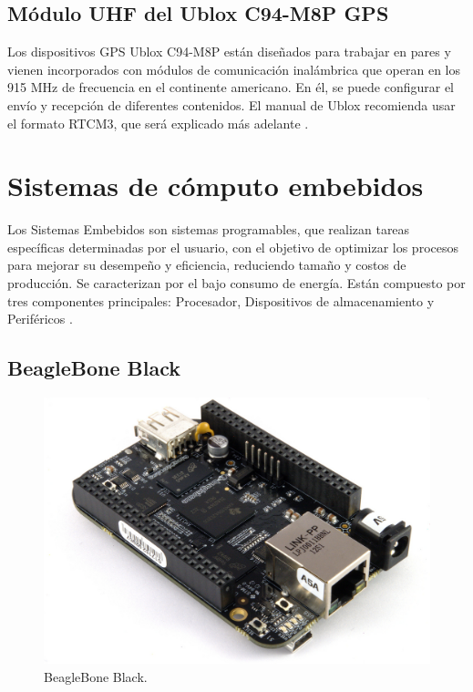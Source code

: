 \subsection{Módulo UHF del Ublox C94-M8P GPS}

Los dispositivos GPS Ublox C94-M8P están diseñados para trabajar en pares y vienen incorporados con módulos de comunicación inalámbrica que operan en los 915 MHz de frecuencia en el continente americano. En él, se puede configurar el envío y recepción de diferentes contenidos. El manual de Ublox recomienda usar el formato RTCM3, que será explicado más adelante \citep{ubloxc94}.

\section{Sistemas de cómputo embebidos}

Los Sistemas Embebidos son sistemas programables, que realizan tareas específicas determinadas por el usuario, con el objetivo de optimizar los procesos para mejorar su desempeño y eficiencia, reduciendo tamaño y costos de producción. Se caracterizan por el bajo consumo de energía. Están compuesto por tres componentes principales: Procesador, Dispositivos de almacenamiento y Periféricos \citep{caballero2014desarrollo}.

\subsection{BeagleBone Black}

\begin{figure}[ht]
\centering
\includegraphics[scale=0.36]{Figures/BeagleBoneBlack}
\caption[BeagleBone Black.]{BeagleBone Black\footnotemark.}
\label{fig:BBlack}
\end{figure}

